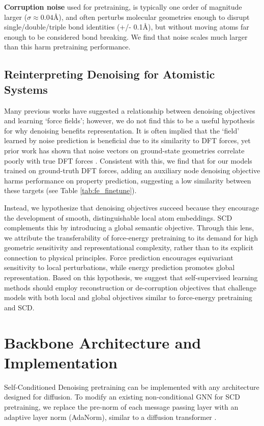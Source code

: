 \textbf{Corruption noise} used for pretraining, is typically one order of magnitude larger ($\sigma \approx 0.04\text{\AA}$), and often perturbs molecular geometries enough to disrupt single/double/triple bond identities (+/- 0.1\AA), but without moving atoms far enough to be considered bond breaking. We find that noise scales much larger than this harm pretraining performance. 


\subsection{Reinterpreting Denoising for Atomistic Systems}
Many previous works have suggested a relationship between denoising objectives and learning `force fields'; however, we do not find this to be a useful hypothesis for why denoising benefits representation. It is often implied that the `field' learned by noise prediction is beneficial due to its similarity to DFT forces, yet prior work has shown that noise vectors on ground-state geometries correlate poorly with true DFT forces \cite{SliDe_Ni2025}. Consistent with this, we find that for our models trained on ground-truth DFT forces, adding an auxiliary node denoising objective harms performance on property prediction, suggesting a low similarity between these targets (see Table \ref{tab:fe_finetune}).

Instead, we hypothesize that denoising objectives succeed because they encourage the development of smooth, distinguishable local atom embeddings. SCD complements this by introducing a global semantic objective. Through this lens, we attribute the transferability of force-energy pretraining to its demand for high geometric sensitivity and representational complexity, rather than to its explicit connection to physical principles. Force prediction encourages equivariant sensitivity to local perturbations, while energy prediction promotes global representation. Based on this hypothesis, we suggest that self-supervised learning methods should employ reconstruction or de-corruption objectives that challenge models with both local and global objectives similar to force-energy pretraining and SCD. 



\section{Backbone Architecture and Implementation}
\label{Arch_and_implement_appendix}

Self-Conditioned Denoising pretraining can be implemented with any architecture designed for diffusion. To modify an existing non-conditional GNN for SCD pretraining, we replace the pre-norm of each message passing layer with an adaptive layer norm (AdaNorm), similar to a diffusion transformer \cite{DiT_peebles2023}. 

